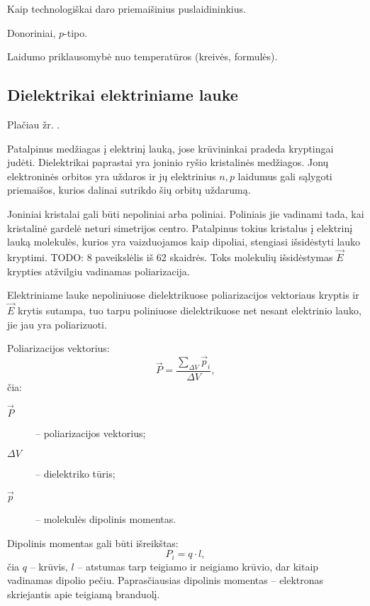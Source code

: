 \begin{remember}
  \item Kaip technologiškai daro priemaišinius puslaidininkius.
  \item Donoriniai, $p$-tipo.
  \item Laidumo priklausomybė nuo temperatūros (kreivės, formulės).
\end{remember}

\subsection{Dielektrikai elektriniame lauke}

Plačiau žr. \cite[37p.]{elektra-magnetizmas}.

Patalpinus medžiagas į elektrinį lauką, jose krūvininkai pradeda
kryptingai judėti. Dielektrikai paprastai yra joninio ryšio
kristalinės medžiagos. Jonų elektroninės orbitos yra uždaros
ir jų elektrinius $n, p$ laidumus gali sąlygoti priemaišos, kurios
dalinai sutrikdo šių orbitų uždarumą.

Joniniai kristalai gali būti nepoliniai arba poliniai. Poliniais
jie vadinami tada, kai kristalinė gardelė neturi simetrijos centro.
Patalpinus tokius kristalus į elektrinį lauką molekulės, kurios
yra vaizduojamos kaip dipoliai, stengiasi išsidėstyti lauko
kryptimi. TODO: 8 paveikslėlis iš 62 skaidrės. Toks molekulių
išsidėstymas $\vec{E}$ krypties atžvilgiu vadinamas poliarizacija.

Elektriniame lauke nepoliniuose dielektrikuose poliarizacijos
vektoriaus kryptis ir $\vec{E}$ krytis sutampa, tuo tarpu poliniuose
dielektrikuose net nesant elektrinio lauko, jie jau yra poliarizuoti.

Poliarizacijos vektorius:
\begin{equation*}
  \vec{P} = \frac{\sum _{\Delta V}\vec{p}_{i}}{\Delta V},
\end{equation*}
čia:
\begin{description}
  \item[$\vec{P}$] – poliarizacijos vektorius;
  \item[$\Delta V$] – dielektriko tūris;
  \item[$\vec{p}$] – molekulės dipolinis momentas.
\end{description}
Dipolinis momentas gali būti išreikštas:
\begin{equation*}
  P_{i} = q \cdot l,
\end{equation*}
čia $q$ – krūvis, $l$ – atstumas tarp teigiamo ir neigiamo krūvio, dar
kitaip vadinamas dipolio pečiu. Paprasčiausias dipolinis momentas –
elektronas skriejantis apie teigiamą branduolį.

